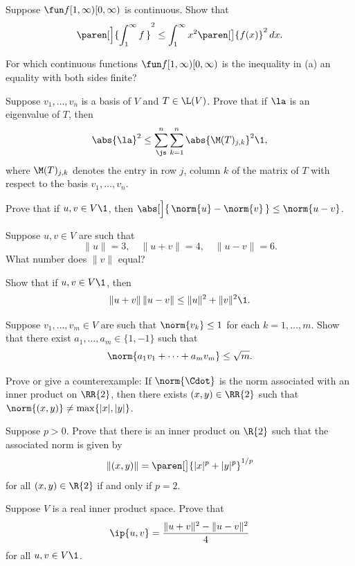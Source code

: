 \exercise
\begin{SUBtheorem}
\item
Suppose $\fun f {[1, \infty)} {[0, \infty)}$ is continuous. Show that
\[
\paren[\Big]{ \int_1^\infty f\,}^2  \le \int_1^\infty x^2 \paren[\big]{ f(x) }^2 \, dx.
\]
\item
For which continuous functions $\fun f {[1, \infty)} {[0, \infty)}$ is the inequality in (a) an equality with both sides finite?
\end{SUBtheorem}


\exercise
Suppose $v_1, \ldots, v_n$ is a basis of $V$ and $T \in \L(V)$. Prove that if $\la$ is an eigenvalue of $T$, then \label{2HSeigen}
\[
\abs{\la}^2 \le \sum_{\js}^n \sum_{k=1}^n \abs{\M(T)_{j,k}}^2\1,
\]
where $\M(T)_{j,k}$ denotes the entry in row $j$, column $k$ of the matrix of $T$ with respect to the basis $v_1, \ldots, v_n$.


\exercise
Prove that if $u, v \in V\1$, then $\abs[\Big]{\, \norm{u} - \norm{v} \,} \le \norm{u-v}$.\label{6reverse}


\exercise
Suppose $u, v \in V$ are such that
\[
\|u\| = 3, \quad \|u + v\| = 4, \quad \|u - v\| = 6.
\]
What number does $\|v\|$ equal?


\exercise
Show that if $u, v \in V\1$, then
\[
\|u + v\| \, \|u - v\| \le \|u\|^2 + \|v\|^2\1.
\]
\exercisedisplayend


\exercise
Suppose $v_1, \dots, v_m \in V$ are such that $\norm{v_k} \le 1$ for each $k= 1, \ldots, m$. Show that there exist
$a_1, \dots, a_m \in \{1, -1\}$ such that
\[
\norm{a_1 v_1 + \dots + a_m v_m} \le \sqrt{m}.
\]
\exercisedisplayend


\exercise
Prove or give a counterexample: If $\norm{\Cdot}$ is the norm associated with an inner product on $\RR{2}$, then there exists $(x, y) \in \RR{2}$ such that
$
\norm{(x, y)} \ne \max\{|x|, |y|\}$.


\exercise
Suppose $p > 0$. Prove that there is an inner product on $\R{2}$ such that the associated norm is given by
\[
\|(x, y)\| = \paren[\big]{|x|^p + |y|^p}^{1/p}
\]
for all $(x, y) \in \R{2}$ if and only if $p = 2$.


\exercise
Suppose $V$ is a real inner product space. Prove that \label{201}
\[
\ip{u, v} = \frac{\|u + v\|^2 - \|u - v\|^2}{4}
\]
for all $u, v \in V\1$.


